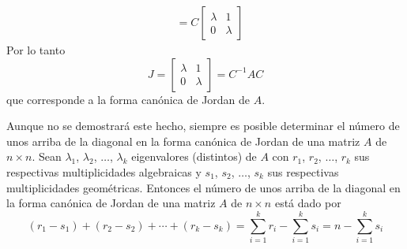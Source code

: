\begin{theorem}
\begin{align*}
        & = C \begin{bmatrix} \lambda & 1 \\ 0 & \lambda \end{bmatrix}
    \end{align*}
    Por lo tanto
    $$J = \begin{bmatrix} \lambda & 1 \\ 0 & \lambda \end{bmatrix} = C^{-1} A C$$
    que corresponde a la forma canónica de Jordan de $A$.
\end{theorem}

Aunque no se demostrará este hecho, siempre es posible determinar el número de unos arriba de la diagonal en la forma canónica de Jordan de una matriz $A$ de $n \times n$. Sean $\lambda_1$, $\lambda_2$, $\dots$, $\lambda_k$ eigenvalores (distintos) de $A$ con $r_1$, $r_2$, $\dots$, $r_k$ sus respectivas multiplicidades algebraicas y $s_1$, $s_2$, $\dots$, $s_k$ sus respectivas multiplicidades geométricas. Entonces el número de unos arriba de la diagonal en la forma canónica de Jordan de una matriz $A$ de $n \times n$ está dado por
$$(r_1 - s_1) + (r_2 - s_2) + \cdots + (r_k - s_k) = \sum_{i = 1}^{k} r_i - \sum_{i = 1}^{k} s_i = n - \sum_{i = 1}^{k} s_i$$

